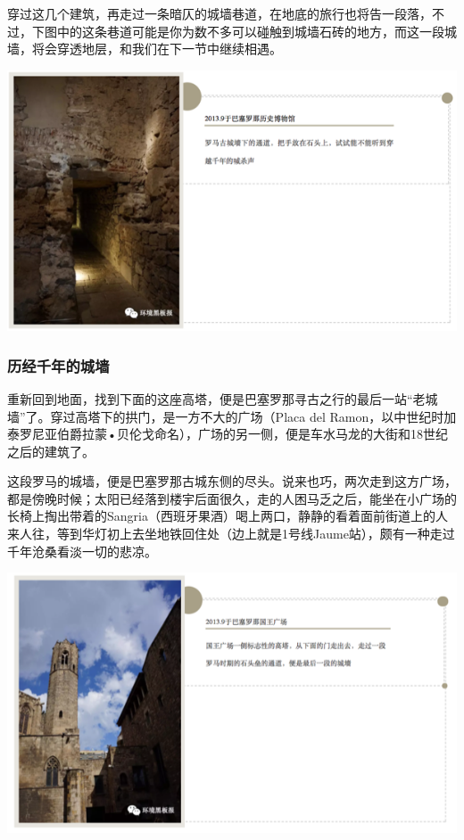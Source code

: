 \documentclass[]{book}
\begin{document}
穿过这几个建筑，再走过一条暗仄的城墙巷道，在地底的旅行也将告一段落，不过，下图中的这条巷道可能是你为数不多可以碰触到城墙石砖的地方，而这一段城墙，将会穿透地层，和我们在下一节中继续相遇。

\includegraphics[width=8.33in]{images/xt18}

\subsubsection{历经千年的城墙}

重新回到地面，找到下面的这座高塔，便是巴塞罗那寻古之行的最后一站``老城墙''了。穿过高塔下的拱门，是一方不大的广场（Placa
del
Ramon，以中世纪时加泰罗尼亚伯爵拉蒙•贝伦戈命名），广场的另一侧，便是车水马龙的大街和18世纪之后的建筑了。

这段罗马的城墙，便是巴塞罗那古城东侧的尽头。说来也巧，两次走到这方广场，都是傍晚时候；太阳已经落到楼宇后面很久，走的人困马乏之后，能坐在小广场的长椅上掏出带着的Sangria（西班牙果酒）喝上两口，静静的看着面前街道上的人来人往，等到华灯初上去坐地铁回住处（边上就是1号线Jaume站），颇有一种走过千年沧桑看淡一切的悲凉。

\includegraphics[width=8.33in]{images/xt19}
\end{document}
